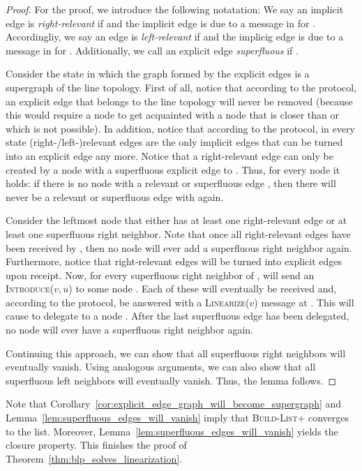 \documentclass[a4paper,USenglish]{lipics}
\newcommand{\blp}{\textsc{Build-List+}\xspace}
\newcommand{\linearize}[1]{\textsc{Linearize(\ensuremath{#1})}\xspace}
\newcommand{\introduce}[1]{\textsc{Introduce(\ensuremath{#1})}\xspace}
\begin{document}
\begin{proof}
    For the proof, we introduce the following notatation: We say an implicit edge  is \emph{right-relevant} if  and the implicit edge  is due to a  message in  for .
    Accordingliy, we say an edge  is \emph{left-relevant} if  and the implicig edge  is due to a  message in  for .
    Additionally, we call an explicit edge  \emph{superfluous} if .


  Consider the state in which the graph formed by the explicit edges is a supergraph of the line topology.
  First of all, notice that according to the protocol, an explicit edge  that belongs to the line topology will never be removed (because this would require a node  to get acquainted with a node  that is closer than  or  which is not possible).
  In addition, notice that according to the protocol, in every state (right-/left-)relevant edges are the only implicit edges that can be turned into an explicit edge any more.
  Notice that a right-relevant edge  can only be created by a node  with a superfluous explicit edge to .
  Thus, for every node  it holds: if there is no node  with a relevant or superfluous edge , then there will never be a relevant or superfluous edge  with  again.
  
  Consider the leftmost node  that either has at least one right-relevant edge or at least one superfluous right neighbor.
  Note that once all right-relevant edges have been received by , then no node  will ever add a superfluous right neighbor again.
  Furthermore, notice that right-relevant edges will be turned into explicit edges upon receipt.
  Now, for every superfluous right neighbor  of ,  will send an \introduce{v,u} to some node .
  Each of these will eventually be received and, according to the protocol, be answered with a \linearize{v} message at .
  This will cause  to delegate  to a node .
  After the last superfluous edge has been delegated, no node  will ever have a superfluous right neighbor again.
  
  Continuing this approach, we can show that all superfluous right neighbors will eventually vanish.
  Using analogous arguments, we can also show that all superfluous left neighbors will eventually vanish.
  Thus, the lemma follows.
\end{proof}
Note that Corollary~\ref{cor:explicit_edge_graph_will_become_supergraph} and Lemma~\ref{lem:superfluous_edges_will_vanish} imply that \blp converges to the list.
Moreover, Lemma~\ref{lem:superfluous_edges_will_vanish} yields the closure property.
This finishes the proof of Theorem~\ref{thm:blp_solves_linearization}.
\end{document}
